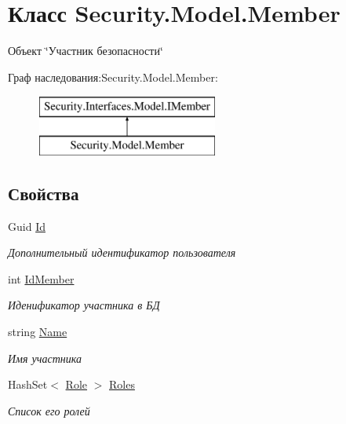 \hypertarget{class_security_1_1_model_1_1_member}{}\section{Класс Security.\+Model.\+Member}
\label{class_security_1_1_model_1_1_member}


Объект \char`\"{}Участник безопасности\char`\"{}  


Граф наследования\+:Security.\+Model.\+Member\+:\begin{figure}[H]
\begin{center}
\leavevmode
\includegraphics[height=2.000000cm]{d7/d43/class_security_1_1_model_1_1_member}
\end{center}
\end{figure}
\subsection*{Свойства}
\begin{DoxyCompactItemize}
\item 
Guid \hyperlink{class_security_1_1_model_1_1_member_a817a8732efdf6e3df86bee02a216b413}{Id}
\begin{DoxyCompactList}\small\item\em Дополнительный идентификатор пользователя \end{DoxyCompactList}\item 
int \hyperlink{class_security_1_1_model_1_1_member_a60191a925cae54811755a16b8eb65503}{Id\+Member}
\begin{DoxyCompactList}\small\item\em Иденификатор участника в БД \end{DoxyCompactList}\item 
string \hyperlink{class_security_1_1_model_1_1_member_aae16a9b4d46718a1388bffae9e930b5b}{Name}
\begin{DoxyCompactList}\small\item\em Имя участника \end{DoxyCompactList}\item 
Hash\+Set$<$ \hyperlink{class_security_1_1_model_1_1_role}{Role} $>$ \hyperlink{class_security_1_1_model_1_1_member_a5817410b5a16776962d4370ebad391f5}{Roles}
\begin{DoxyCompactList}\small\item\em Список его ролей \end{DoxyCompactList}\end{DoxyCompactItemize}


